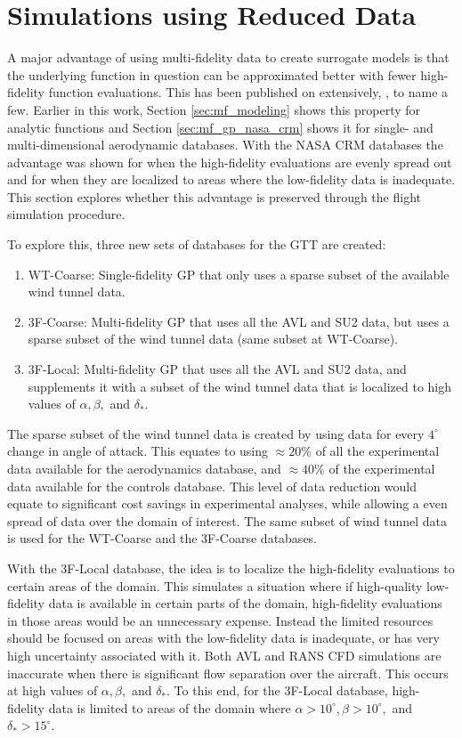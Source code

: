 \section{Simulations using Reduced Data}

A major advantage of using multi-fidelity data to create surrogate models is that the underlying function in question can be approximated better with fewer high-fidelity function evaluations.
This has been published on extensively, \cite{kennedy_predicting_2000,gratiet_multi-fidelity_nodate,perdikaris_multi-fidelity_2015, ghoreishi_gaussian_2018}, to name a few. 
Earlier in this work, Section \ref{sec:mf_modeling} shows this property for analytic functions and Section \ref{sec:mf_gp_nasa_crm} shows it for single- and multi-dimensional aerodynamic databases.
With the NASA CRM databases the advantage was shown for when the high-fidelity evaluations are evenly spread out and for when they are localized to areas where the low-fidelity data is inadequate. 
This section explores whether this advantage is preserved through the flight simulation procedure. 

To explore this, three new sets of databases for the GTT are created:
\begin{enumerate}
    \item WT-Coarse: Single-fidelity GP that only uses a sparse subset of the available wind tunnel data.
    \item 3F-Coarse: Multi-fidelity GP that uses all the AVL and SU2 data, but uses a sparse subset of the wind tunnel data (same subset at WT-Coarse).
    \item 3F-Local: Multi-fidelity GP that uses all the AVL and SU2 data, and supplements it with a subset of the wind tunnel data that is localized to high values of $\alpha, \beta,$ and $\delta_*$.
\end{enumerate}

The sparse subset of the wind tunnel data is created by using data for every $4^\circ$ change in angle of attack.
This equates to using $\approx20\%$ of all the experimental data available for the aerodynamics database, and $\approx40\%$ of the experimental data available for the controls database. 
This level of data reduction would equate to significant cost savings in experimental analyses, while allowing a even spread of data over the domain of interest. 
The same subset of wind tunnel data is used for the WT-Coarse and the 3F-Coarse databases. 

With the 3F-Local database, the idea is to localize the high-fidelity evaluations to certain areas of the domain.
This simulates a situation where if high-quality low-fidelity data is available in certain parts of the domain, high-fidelity evaluations in those areas would be an unnecessary expense. 
Instead the limited resources should be focused on areas with the low-fidelity data is inadequate, or has very high uncertainty associated with it. 
Both AVL and RANS CFD simulations are inaccurate when there is significant flow separation over the aircraft. 
This occurs at high values of $\alpha, \beta,$ and $\delta_*$.
To this end, for the 3F-Local database, high-fidelity data is limited to areas of the domain where $\alpha > 10^\circ, \beta > 10^\circ,$ and $\delta_* > 15^\circ$.

